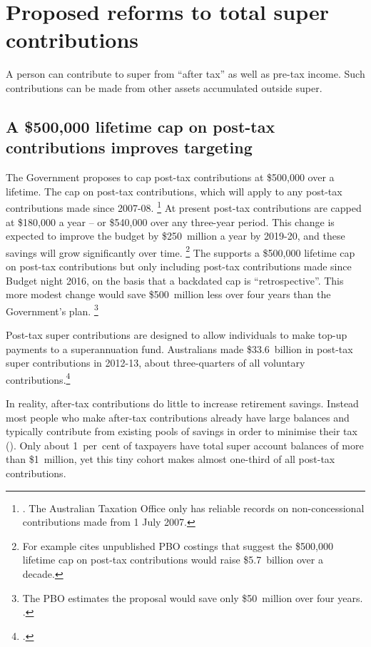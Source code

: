 \documentclass[continuous]{grattan}\usepackage[]{graphicx}\usepackage[]{color}
\begin{document}
\chapter{{Proposed reforms to total super contributions}}\label{chap:proposed-reforms-to-total-super-contributions}
A person can contribute to super from “after tax” as well as pre-tax income. 
Such contributions can be made from other assets accumulated outside super.

\section{A \$500,000 lifetime cap on post-tax contributions improves targeting}\label{sec:the-500000-lifetime-cap-on-post-tax-contributions-is-a-big-step-forward}
The Government proposes to cap post-tax contributions at \$500,000 over a lifetime. 
The cap on post-tax contributions, which will apply to any post-tax contributions made since 2007-08.%
\footnote{\textcite{BudgetPapers201617}. The Australian Taxation Office only has reliable records on non-concessional contributions made from 1 July 2007.} %
At present post-tax contributions are capped at \$180,000 a year -- or \$540,000 over any three-year period.
This change is expected to improve the budget by \$250~million a year by 2019-20, and these savings will grow significantly over time.%
\footnote{For example \textcite{Coorey-2016-Super-cap-PBO} cites unpublished PBO costings that suggest the \$500,000 lifetime cap on post-tax contributions would raise \$5.7~billion over a decade.}
The \ALP{} supports a \$500,000 lifetime cap on post-tax contributions but only including post-tax contributions made since Budget night 2016, on the basis that a backdated cap is “retrospective”. 
This more modest change would save \$500~million less over four years than the Government’s plan.%
\footnote{The PBO estimates the \ALP{} proposal would save only \$50~million over four years. \textcite{ALP-2016-Making-super-fairer}.}






Post-tax super contributions are designed to allow individuals to make top-up payments to a superannuation fund.
Australians made \$33.6~billion in post-tax super contributions in 2012-13, about three-quarters of all voluntary contributions.\footcite[][54]{DaleyCoatesWoodEtAl2015Super} 





In reality, after-tax contributions do little to increase retirement savings.
Instead most people who make after-tax contributions already have large balances and typically contribute from existing pools of savings in order to minimise their tax ().
Only about 1~per~cent of taxpayers have total super account balances of more than \$1~million, yet this tiny cohort makes almost one-third of all post-tax contributions.
\end{document}
